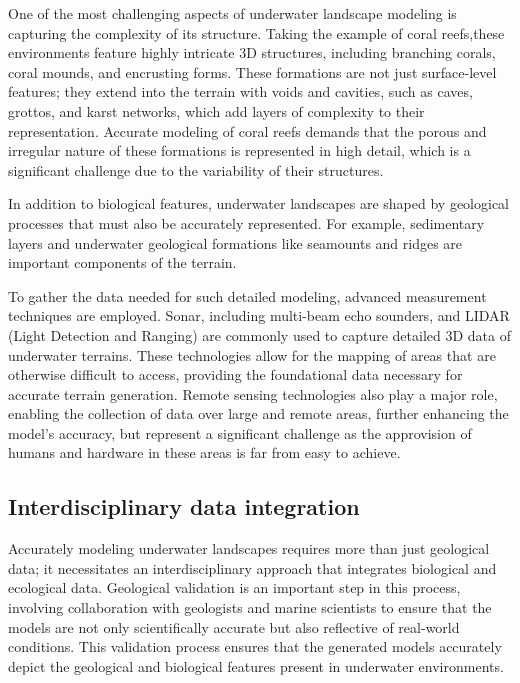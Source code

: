 One of the most challenging aspects of underwater landscape modeling is capturing the complexity of its structure. Taking the example of coral reefs,these environments feature highly intricate 3D structures, including branching corals, coral mounds, and encrusting forms. These formations are not just surface-level features; they extend into the terrain with voids and cavities, such as caves, grottos, and karst networks, which add layers of complexity to their representation. Accurate modeling of coral reefs demands that the porous and irregular nature of these formations is represented in high detail, which is a significant challenge due to the variability of their structures.

In addition to biological features, underwater landscapes are shaped by geological processes that must also be accurately represented. For example, sedimentary layers and underwater geological formations like seamounts and ridges are important components of the terrain. 

To gather the data needed for such detailed modeling, advanced measurement techniques are employed. Sonar, including multi-beam echo sounders, and LIDAR (Light Detection and Ranging) are commonly used to capture detailed 3D data of underwater terrains. These technologies allow for the mapping of areas that are otherwise difficult to access, providing the foundational data necessary for accurate terrain generation. Remote sensing technologies also play a major role, enabling the collection of data over large and remote areas, further enhancing the model's accuracy, but represent a significant challenge as the approvision of humans and hardware in these areas is far from easy to achieve.

\subsection{Interdisciplinary data integration}

Accurately modeling underwater landscapes requires more than just geological data; it necessitates an interdisciplinary approach that integrates biological and ecological data. Geological validation is an important step in this process, involving collaboration with geologists and marine scientists to ensure that the models are not only scientifically accurate but also reflective of real-world conditions. This validation process ensures that the generated models accurately depict the geological and biological features present in underwater environments.

